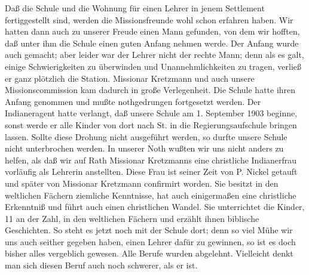 Daß die Schule und die Wohnung für einen Lehrer in jenem Settlement fertiggestellt sind, werden die Missionsfreunde wohl schon erfahren haben. Wir hatten dann auch zu unserer Freude einen Mann gefunden, von dem wir hofften, daß unter ihm die Schule einen guten Anfang nehmen werde. Der Anfang wurde auch gemacht; aber leider war der Lehrer nicht der rechte Mann; denn als es galt, einige Schwierigkeiten zu überwinden und Unannehmlichkeiten zu tragen, verließ er ganz plötzlich die Station. Missionar Kretzmann und auch unsere Missionscommission kam dadurch in große Verlegenheit. Die Schule hatte ihren Anfang genommen und mußte nothgedrungen fortgesetzt werden. Der Indianeragent hatte verlangt, daß unsere Schule am 1. September 1903 beginne, sonst werde er alle Kinder von dort nach St. in die Regierungsaufschule bringen lassen. Sollte diese Drohung nicht ausgeführt werden, so durfte unsere Schule nicht unterbrochen werden. In unserer Noth wußten wir uns nicht anders zu helfen, als daß wir auf Rath Missionar Kretzmanns eine christliche Indianerfrau vorläufig als Lehrerin anstellten. Diese Frau ist seiner Zeit von P. Nickel getauft und später von Missionar Kretzmann confirmirt worden. Sie besitzt in den weltlichen Fächern ziemliche Kenntnisse, hat auch einigermaßen eine christliche Erkenntniß und führt auch einen christlichen Wandel. Sie unterrichtet die Kinder, 11 an der Zahl, in den weltlichen Fächern und erzählt ihnen biblische Geschichten. So steht es jetzt noch mit der Schule dort; denn so viel Mühe wir uns auch seither gegeben haben, einen Lehrer dafür zu gewinnen, so ist es doch bisher alles vergeblich gewesen. Alle Berufe wurden abgelehnt. Vielleicht denkt man sich diesen Beruf auch noch schwerer, als er ist.


